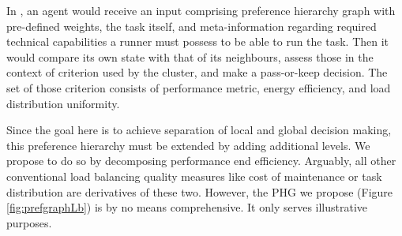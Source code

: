 In \cite{murashov-2022}, an agent would receive an input comprising preference hierarchy graph with pre-defined weights, the task itself, and meta-information regarding required technical capabilities a runner must possess to be able to run the task.
Then it would compare its own state with that of its neighbours, assess those in the context of criterion used by the cluster, and make a pass-or-keep decision.
The set of those criterion consists of performance metric, energy efficiency, and load distribution uniformity.

Since the goal here is to achieve separation of local and global decision making, this preference hierarchy must be extended by adding additional levels.
We propose to do so by decomposing performance end efficiency.
Arguably, all other conventional load balancing quality measures like cost of maintenance or task distribution are derivatives of these two.
However, the PHG we propose (Figure \ref{fig:prefgraphLb}) is by no means comprehensive.
It only serves illustrative purposes.
